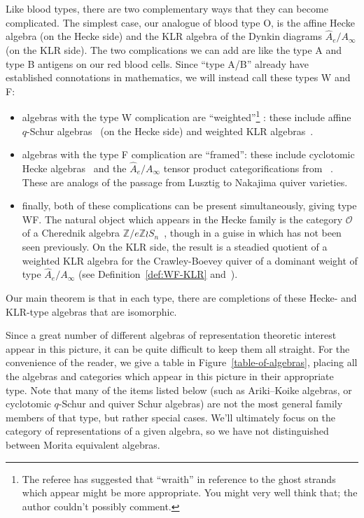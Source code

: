 \documentclass[ALCO,ThmDefs,Unicode,epreuves]{cedram}
\newcommand{\Z}{\mathbb{Z}}
\newcommand{\cO}{\mathcal{O}}
\begin{document}
Like blood types, there are two complementary ways that they can
become complicated. The simplest case, our analogue of blood type O,
is the affine Hecke algebra (on the Hecke side) and the KLR algebra of
the Dynkin diagrams $\hat{A}_e/A_\infty$ (on the KLR side). The two complications we can
add are like the type A and type B antigens on our red blood cells.
Since ``type A/B'' already have established connotations in
mathematics, we will instead call these types W and F:
\begin{itemize} 
\item algebras with the type W complication are ``weighted''\footnote{The referee has suggested that
 ``wraith'' in reference to the ghost strands which appear might be
 more appropriate. You might very well think that; the author couldn't possibly comment.} : these
 include affine $q$-Schur algebras~\cite{GreenSchur} (on the Hecke side) and weighted KLR
 algebras~\cite{WebwKLR}.
\item algebras with the type F complication are 
 ``framed'': these include cyclotomic Hecke algebras~\cite{AK} and the
 $\hat{A}_e/A_\infty$ tensor product categorifications from
~\cite{Webmerged}. These are analogs of the passage from Lusztig to
 Nakajima quiver varieties.
\item finally, both of these complications can be present
 simultaneously, giving type WF. The natural object which appears in
 the Hecke family is the category $\cO$ of a Cherednik algebra $\Z/e\Z\wr
 S_n$~\cite{GGOR}, though in a guise in which has not been seen previously. On
 the KLR side, the result is a steadied quotient of a weighted KLR
 algebra for the Crawley-Boevey quiver of a dominant weight of type
 $\hat{A}_e/A_\infty$ (see Definition~\ref{def:WF-KLR} and~\cite[\S~3.1]{WebwKLR}).
\end{itemize}

Our main theorem is that in each type, there are completions of these
Hecke- and KLR-type algebras that are isomorphic.

Since a great number of different algebras of representation theoretic
interest appear in this picture, it can be quite difficult to keep
them all straight. For the convenience of the reader, we give a table
in Figure~\ref{table-of-algebras}, placing all the algebras and categories which appear in this picture in their
appropriate type. Note that many of the items listed below (such as
Ariki--Koike algebras, or cyclotomic $q$-Schur and quiver Schur
algebras) are not the most general family members of that type, but
rather special cases. We'll ultimately focus on the category of
representations of a given algebra, so we have not
distinguished between Morita equivalent algebras. 
\end{document}
